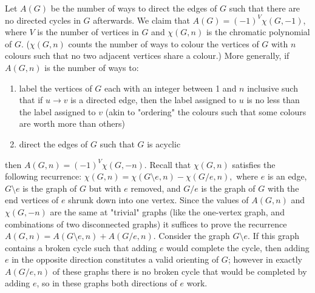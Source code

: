 \begin{solution}
    Let $A(G)$ be the number of ways to direct the edges of $G$ such that there are no 
    directed cycles in $G$ afterwards. We claim that $A(G) = (-1)^V\chi(G, -1)$, where $V$ 
    is the number of vertices in $G$ and $\chi(G, n)$ is the chromatic polynomial of $G$. 
    ($\chi(G, n)$ counts the number of ways to colour the vertices of $G$ with $n$ colours such 
    that no two adjacent vertices share a colour.)
    More generally, if $A(G, n)$ is the number of ways to: 
    \begin{enumerate}[noitemsep]
        \item label the vertices of $G$ each with an integer between 1 and $n$ inclusive such that if 
        $u \to v$ is a directed edge, then the label assigned to $u$ is no less than the label 
        assigned to $v$ (akin to "ordering" the colours such that some colours are worth more than others)
        \item direct the edges of $G$ such that $G$ is acyclic
    \end{enumerate}
    then $A(G, n) = (-1)^V\chi(G, -n)$. Recall that $\chi(G, n)$ satisfies the following recurrence: 
    $\chi(G, n) = \chi(G\setminus e, n) - \chi(G/e, n),$ where $e$ is an edge, $G\setminus e$ 
    is the graph of $G$ but with $e$ removed, and $G/e$ is the graph of $G$ with the end vertices 
    of $e$ shrunk down into one vertex. Since the values of $A(G, n)$ and $\chi(G, -n)$ are the same 
    at "trivial" graphs (like the one-vertex graph, and combinations of two disconnected graphs) 
    it suffices to prove the recurrence $A(G, n) = A(G\setminus e, n) + A(G/e, n)$. 
    Consider the graph $G\setminus e$. If this graph contains a broken cycle such that adding $e$ 
    would complete the cycle, then adding $e$ in the opposite direction constitutes a valid 
    orienting of $G$; however in exactly $A(G/e, n)$ of these graphs there is no broken 
    cycle that would be completed by adding $e$, so in these graphs both directions of $e$ work. 
\end{solution}\medskip

